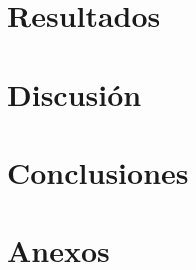 \documentclass[journal]{IEEEtran}
\begin{document}
    
    
    
    

    \section{Resultados}
    

    \section{Discusión}
    

    \section{Conclusiones}

    
    
    

    
    
    
    

    \section{Anexos}

    
    
    
\end{document}
